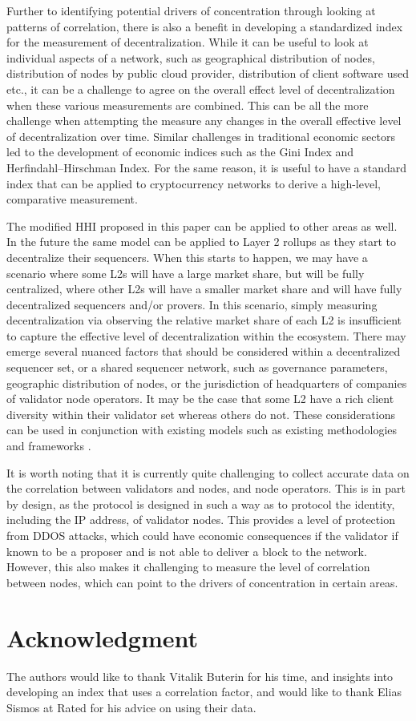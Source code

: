 \documentclass[conference]{IEEEtran}
\begin{document}
Further to identifying potential drivers of concentration through looking at patterns of correlation, there is also a benefit in developing a standardized index for the measurement of decentralization.  While it can be useful to look at individual aspects of a network, such as geographical distribution of nodes, distribution of nodes by public cloud provider, distribution of client software used etc., it can be a challenge to agree on the overall effect level of decentralization when these various measurements are combined.  This can be all the more challenge when attempting the measure any changes in the overall effective level of decentralization over time.  Similar challenges in traditional economic sectors led to the development of economic indices such as the Gini Index and Herfindahl–Hirschman Index.  For the same reason, it is useful to have a standard index that can be applied to cryptocurrency networks to derive a high-level, comparative measurement.

The modified HHI proposed in this paper can be applied to other areas as well.  In the future the same model can be applied to Layer 2 rollups as they start to decentralize their sequencers.  When this starts to happen, we may have a scenario where some L2s will have a large market share, but will be fully centralized, where other L2s will have a smaller market share and will have fully decentralized sequencers and/or provers.  In this scenario, simply measuring decentralization via observing the relative market share of each L2 is insufficient to capture the effective level of decentralization within the ecosystem.  There may emerge several nuanced factors that should be considered within a decentralized sequencer set, or a shared sequencer network, such as governance parameters, geographic distribution of nodes, or the jurisdiction of headquarters of companies of validator node operators.  It may be the case that some L2 have a rich client diversity within their validator set whereas others do not.  These considerations can be used in conjunction with existing models such as existing methodologies and frameworks \cite{l2beat2024}.

It is worth noting that it is currently quite challenging to collect accurate data on the  correlation between validators and nodes, and node operators.  This is in part by design, as the protocol is designed in such a way as to protocol the identity, including the IP address, of validator nodes.  This provides a level of protection from DDOS attacks, which could have economic consequences if the validator if known to be a proposer and is not able to deliver a block to the network.  However, this also makes it challenging to measure the level of correlation between nodes, which can point to the drivers of concentration in certain areas.

\section*{Acknowledgment}

The authors would like to thank Vitalik Buterin for his time, and insights into developing an index that uses a correlation factor, and would like to thank Elias Sismos at Rated for his advice on using their data.

\printbibliography
\end{document}
